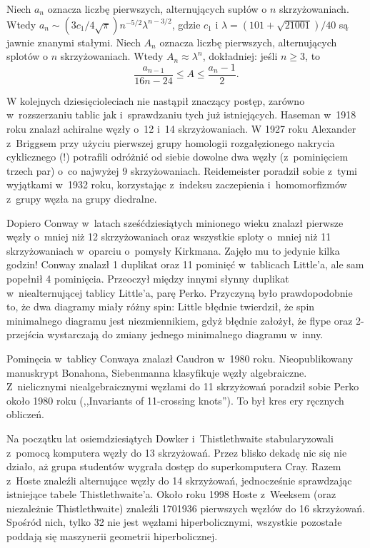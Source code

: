 {\begin{proposition}
    Niech $a_n$ oznacza liczbę pierwszych, alternujących supłów o $n$ skrzyżowaniach.
    Wtedy $a_n \sim (3c_1/4\sqrt{\pi})n^{-5/2}\lambda^{n-3/2}$, gdzie $c_1$ i $\lambda = (101 + \sqrt{21001})/40$ są jawnie znanymi stałymi.
    Niech $A_n$ oznacza liczbę pierwszych, alternujących splotów o $n$ skrzyżowaniach.
    Wtedy $A_n \approx \lambda^n$, dokładniej: jeśli $n \ge 3$, to
    \[
        \frac{a_{n-1}}{16n - 24} \le A \le \frac{a_n - 1}{2}.
    \]
\end{proposition}

W kolejnych dziesięcioleciach nie nastąpił znaczący postęp, zarówno w~rozszerzaniu tablic jak i~sprawdzaniu tych już istniejących.
Haseman w~1918 roku znalazł achiralne węzły o~12 i~14 skrzyżowaniach.
W 1927 roku Alexander z~Briggsem przy użyciu pierwszej grupy homologii rozgałęzionego nakrycia cyklicznego (!) potrafili odróżnić od siebie dowolne dwa węzły (z~pominięciem trzech par) o~co najwyżej 9 skrzyżowaniach.
Reidemeister poradził sobie z~tymi wyjątkami w~1932 roku, korzystając z~indeksu zaczepienia i~homomorfizmów z~grupy węzła na grupy diedralne.


Dopiero Conway w~latach sześćdziesiątych minionego wieku znalazł pierwsze węzły o~mniej niż 12 skrzyżowaniach oraz wszystkie sploty o~mniej niż 11 skrzyżowaniach w~oparciu o~pomysły Kirkmana.
Zajęło mu to jedynie kilka godzin!
Conway znalazł 1 duplikat oraz 11 pominięć w~tablicach Little'a, ale sam popełnił 4 pominięcia.
Przeoczył między innymi słynny duplikat w~niealternującej tablicy Little'a, parę Perko.
Przyczyną było prawdopodobnie to, że dwa diagramy miały różny spin:
Little błędnie twierdził, że spin minimalnego diagramu jest niezmiennikiem, gdyż błędnie założył, że flype oraz 2-przejścia wystarczają do zmiany jednego minimalnego diagramu w~inny.

Pominęcia w~tablicy Conwaya znalazł Caudron w~1980 roku.
Nieopublikowany manuskrypt Bonahona, Siebenmanna klasyfikuje węzły algebraiczne.
Z~nielicznymi niealgebraicznymi węzłami do 11 skrzyżowań poradził sobie Perko około 1980 roku (,,Invariants of 11-crossing knots'').
To był kres ery ręcznych obliczeń.

Na początku lat osiemdziesiątych Dowker i~Thistlethwaite stabularyzowali z~pomocą komputera węzły do 13 skrzyżowań.
Przez blisko dekadę nic się nie działo, aż grupa studentów wygrała dostęp do superkomputera Cray.
Razem z~Hoste znaleźli alternujące węzły do 14 skrzyżowań, jednocześnie sprawdzając istniejące tabele Thistlethwaite'a.
Około roku 1998 Hoste z~Weeksem (oraz niezależnie Thistlethwaite) znaleźli 1701936 pierwszych węzłów do 16 skrzyżowań.
Spośród nich, tylko 32 nie jest węzłami hiperbolicznymi, wszystkie pozostałe poddają się maszynerii geometrii hiperbolicznej.

}
